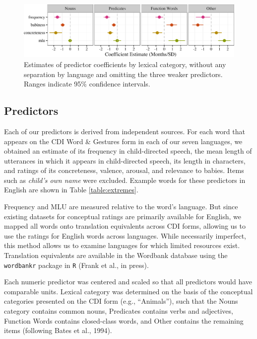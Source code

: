 \documentclass[10pt, letterpaper]{article}
\newenvironment{CodeChunk}{}{}
\begin{document}
\begin{CodeChunk}
\begin{figure}[tb]

{\centering \includegraphics{figs/coefs_lexcat-1} 

}

\caption[Estimates of predictor coefficients by lexical category, without any separation by language and omitting the three weaker predictors]{Estimates of predictor coefficients by lexical category, without any separation by language and omitting the three weaker predictors. Ranges indicate 95\% confidence intervals.}\label{fig:coefs_lexcat}
\end{figure}
\end{CodeChunk}

\subsection{Predictors}\label{predictors}

Each of our predictors is derived from independent sources. For each
word that appears on the CDI Word \& Gestures form in each of our seven
languages, we obtained an estimate of its frequency in child-directed
speech, the mean length of utterances in which it appears in
child-directed speech, its length in characters, and ratings of its
concreteness, valence, arousal, and relevance to babies. Items such as
\emph{child's own name} were excluded. Example words for these
predictors in English are shown in Table \ref{table:extremes}.

Frequency and MLU are measured relative to the word's language. But
since existing datasets for conceptual ratings are primarily available
for English, we mapped all words onto translation equivalents across CDI
forms, allowing us to use the ratings for English words across
languages. While necessarily imperfect, this method allows us to examine
languages for which limited resources exist. Translation equivalents are
available in the Wordbank database using the \texttt{wordbankr} package
in \texttt{R} (Frank et al., in press).

Each numeric predictor was centered and scaled so that all predictors
would have comparable units. Lexical category was determined on the
basis of the conceptual categories presented on the CDI form (e.g.,
``Animals''), such that the Nouns category contains common nouns,
Predicates contains verbs and adjectives, Function Words contains
closed-class words, and Other contains the remaining items (following
Bates et al., 1994).
\end{document}
